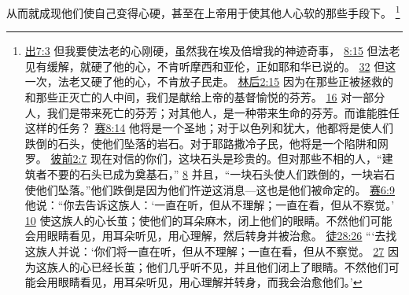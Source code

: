 \documentclass[12pt, a4paper, oneside]{ctexart}
\begin{document}
	从而就成现他们使自己变得心硬，甚至在上帝用于使其他人心软的那些手段下。
	\footnote {
		\href{https://biblehub.com/exodus/7-3.htm}{出7:3} 但我要使法老的心刚硬，虽然我在埃及倍增我的神迹奇事，
		\href{https://biblehub.com/exodus/8-15.htm}{8:15} 但法老见有缓解，就硬了他的心，不肯听摩西和亚伦，正如耶和华已说的。
		\href{https://biblehub.com/exodus/8-32.htm}{32} 但这一次，法老又硬了他的心，不肯放子民走。
		\href{https://biblehub.com/2_corinthians/2-15.htm}{林后2:15} 因为在那些正被拯救的和那些正灭亡的人中间，我们是献给上帝的基督愉悦的芬芳。
		\href{https://biblehub.com/2_corinthians/2-16.htm}{16} 对一部分人，我们是带来死亡的芬芳；对其他人，是一种带来生命的芬芳。而谁能胜任这样的任务？
		\href{https://biblehub.com/isaiah/8-14.htm}{赛8:14} 他将是一个圣地；对于以色列和犹大，他都将是使人们跌倒的石头，使他们坠落的岩石。对于耶路撒冷子民，他将是一个陷阱和网罗。
		\href{https://biblehub.com/1_peter/2-7.htm}{彼前2:7} 现在对信的你们，这块石头是珍贵的。但对那些不相的人，“建筑者不要的石头已成为奠基石，”
		\href{https://biblehub.com/1_peter/2-8.htm}{8} 并且，“一块石头使人们跌倒的，一块岩石使他们坠落。”他们跌倒是因为他们忤逆这消息---这也是他们被命定的。
		\href{https://biblehub.com/isaiah/6-9.htm}{赛6:9} 他说：“你去告诉这族人：‘一直在听，但从不理解；一直在看，但从不察觉。’
		\href{https://biblehub.com/isaiah/6-10.htm}{10} 使这族人的心长茧；使他们的耳朵麻木，闭上他们的眼睛。不然他们可能会用眼睛看见，用耳朵听见，用心理解，然后转身并被治愈。
		\href{https://biblehub.com/acts/28-26.htm}{徒28:26} “‘去找这族人并说：‘你们将一直在听，但从不理解；一直在看，但从不察觉。
		\href{https://biblehub.com/acts/28-27.htm}{27} 因为这族人的心已经长茧；他们几乎听不见，并且他们闭上了眼睛。不然他们可能会用眼睛看见，用耳朵听见，用心理解并转身，而我会治愈他们。’
	}
\end{document}
